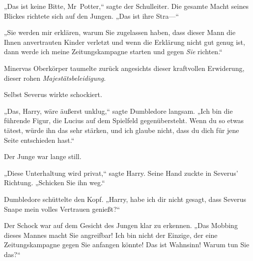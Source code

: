 „Das ist keine Bitte, Mr~Potter,“ sagte der Schulleiter. Die gesamte Macht seines Blickes richtete sich auf den Jungen. „Das ist ihre Stra—“

„Sie werden mir erklären, warum Sie zugelassen haben, dass dieser Mann die Ihnen anvertrauten Kinder verletzt und wenn die Erklärung nicht gut genug ist, dann werde ich meine Zeitungskampagne starten und gegen \emph{Sie} richten.“

Minervas Oberkörper taumelte zurück angesichts dieser kraftvollen Erwiderung, dieser rohen \emph{Majestätsbeleidigung}.

Selbst Severus wirkte schockiert.

„Das, Harry, wäre äußerst unklug,“ sagte Dumbledore langsam. „Ich bin die führende Figur, die Lucius auf dem Spielfeld gegenübersteht. Wenn du so etwas tätest, würde ihn das sehr stärken, und ich glaube nicht, dass du dich für jene Seite entschieden hast.“

Der Junge war lange still.

„Diese Unterhaltung wird privat,“ sagte Harry. Seine Hand zuckte in Severus’ Richtung. „Schicken Sie ihn weg.“

Dumbledore schüttelte den Kopf. „Harry, habe ich dir nicht gesagt, dass Severus Snape mein volles Vertrauen genießt?“

Der Schock war auf dem Gesicht des Jungen klar zu erkennen. „Das Mobbing dieses Mannes macht Sie angreifbar! Ich bin nicht der Einzige, der eine Zeitungskampagne gegen Sie anfangen könnte! Das ist Wahnsinn! Warum tun Sie das?“

